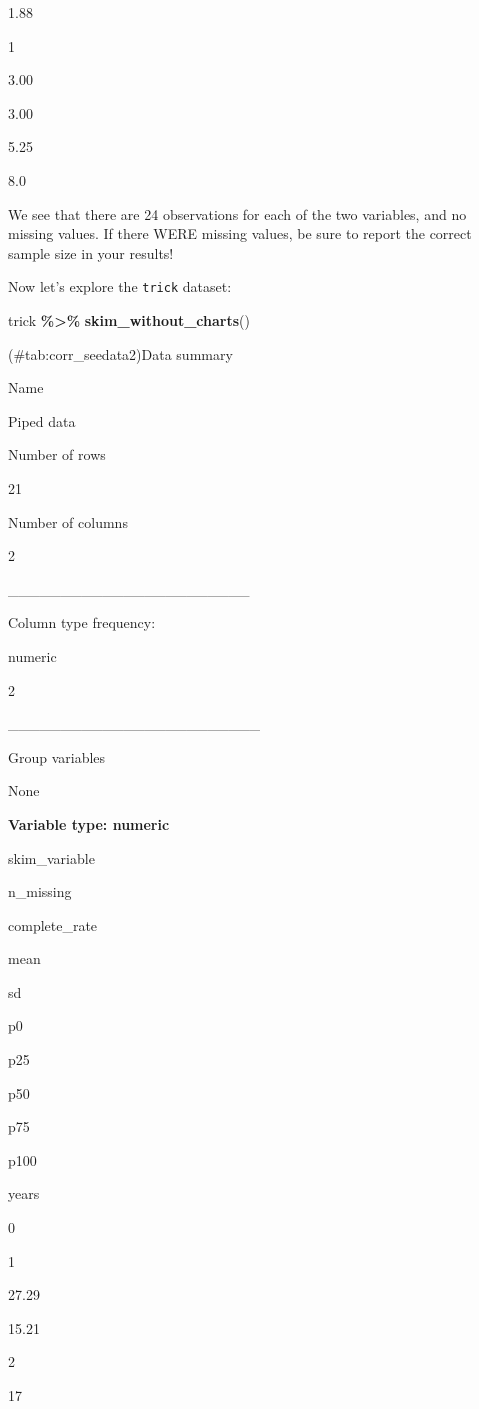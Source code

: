 \documentclass[
]{book}
\newenvironment{Shaded}{\begin{snugshade}}{\end{snugshade}}
\newcommand{\FunctionTok}[1]{\textcolor[rgb]{0.13,0.29,0.53}{\textbf{#1}}}
\newcommand{\NormalTok}[1]{#1}
\newcommand{\SpecialCharTok}[1]{\textcolor[rgb]{0.81,0.36,0.00}{\textbf{#1}}}
\begin{document}
1.88

1

3.00

3.00

5.25

8.0

We see that there are 24 observations for each of the two variables, and no missing values. If there WERE missing values, be sure to report the correct sample size in your results!

Now let's explore the \texttt{trick} dataset:

\begin{Shaded}
\begin{Highlighting}[]
\NormalTok{trick }\SpecialCharTok{\%\textgreater{}\%} \FunctionTok{skim\_without\_charts}\NormalTok{()}
\end{Highlighting}
\end{Shaded}

(\#tab:corr\_seedata2)Data summary

Name

Piped data

Number of rows

21

Number of columns

2

\_\_\_\_\_\_\_\_\_\_\_\_\_\_\_\_\_\_\_\_\_\_\_

Column type frequency:

numeric

2

\_\_\_\_\_\_\_\_\_\_\_\_\_\_\_\_\_\_\_\_\_\_\_\_

Group variables

None

\textbf{Variable type: numeric}

skim\_variable

n\_missing

complete\_rate

mean

sd

p0

p25

p50

p75

p100

years

0

1

27.29

15.21

2

17
\end{document}
